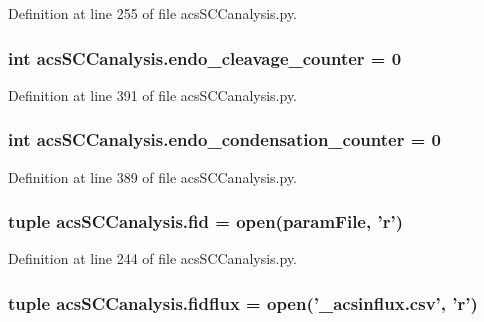 Definition at line 255 of file acs\-S\-C\-Canalysis.\-py.

\hypertarget{a00102_af5702a39b502da88dde8c38417a0efbd}{
\subsubsection[{endo\-\_\-cleavage\-\_\-counter}]{\setlength{\rightskip}{0pt plus 5cm}int acs\-S\-C\-Canalysis.\-endo\-\_\-cleavage\-\_\-counter = 0}}\label{a00102_af5702a39b502da88dde8c38417a0efbd}


Definition at line 391 of file acs\-S\-C\-Canalysis.\-py.

\hypertarget{a00102_a20a51ec68106a5a97fb3a72f417ca4e6}{
\subsubsection[{endo\-\_\-condensation\-\_\-counter}]{\setlength{\rightskip}{0pt plus 5cm}int acs\-S\-C\-Canalysis.\-endo\-\_\-condensation\-\_\-counter = 0}}\label{a00102_a20a51ec68106a5a97fb3a72f417ca4e6}


Definition at line 389 of file acs\-S\-C\-Canalysis.\-py.

\hypertarget{a00102_a424e2204e89264a827e6cad861ebcbc1}{
\subsubsection[{fid}]{\setlength{\rightskip}{0pt plus 5cm}tuple acs\-S\-C\-Canalysis.\-fid = open({\bf param\-File}, '{\bf r}')}}\label{a00102_a424e2204e89264a827e6cad861ebcbc1}


Definition at line 244 of file acs\-S\-C\-Canalysis.\-py.

\hypertarget{a00102_a0c40e4d9928e8df792b31c7a431d3fba}{
\subsubsection[{fidflux}]{\setlength{\rightskip}{0pt plus 5cm}tuple acs\-S\-C\-Canalysis.\-fidflux = open('\-\_\-acsinflux.\-csv', '{\bf r}')}}\label{a00102_a0c40e4d9928e8df792b31c7a431d3fba}


